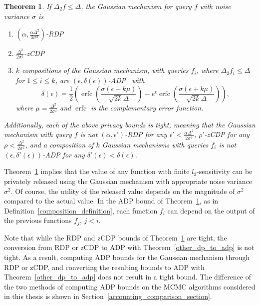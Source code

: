 \documentclass[english,twoside,openright]{HYgraduMLDS}
\newtheorem{theorem}{Theorem}
\DeclareMathOperator{\erfc}{erfc}
\begin{document}
\begin{theorem}\label{gauss-DP-bounds}
  If \(\Delta_{2}f \leq \Delta\), the Gaussian mechanism for query \(f\) with
  noise variance \(\sigma\) is
    \begin{enumerate}
        \item 
            \((\alpha, \frac{\alpha \Delta^2}{2\sigma^2})\)-RDP~\cite{Mironov17}
        \item 
            \(\frac{\Delta^2}{2\sigma^2}\)-zCDP~\cite{BuS16}
        \item 
            \(k\) compositions of the Gaussian mechanism, with
            queries \(f_{i}\), where \(\Delta_{2}f_{i}\leq \Delta\) for
            \(1\leq i \leq k\), are
            \((\epsilon, \delta(\epsilon))\)-ADP~\cite{Sommer2019} with 
            \[
                \delta(\epsilon) 
                = \frac{1}{2}\left(
                    \erfc\left(\frac{\sigma(\epsilon - k\mu)}{\sqrt{2k}\Delta}\right)
                    - e^\epsilon \erfc\left(\frac{\sigma(\epsilon + k\mu)}{\sqrt{2k}\Delta}\right)
                \right),
            \]
            where \(\mu = \frac{\Delta^2}{2\sigma^2}\) and \(\erfc\) is 
            the complementary error function.
    \end{enumerate}
    Additionally, each of the above privacy bounds is tight, meaning that
    the Gaussian mechanism with query \(f\) is not \((\alpha, \epsilon')\)-RDP
    for any \(\epsilon' < \frac{\alpha\Delta^{2}}{2\sigma^{2}}\), \(\rho'\)-zCDP
    for any \(\rho < \frac{\Delta^{2}}{2\sigma^{2}}\), and a composition
    of \(k\) Gaussian mechanisms with queries \(f_{i}\) is not
    \((\epsilon, \delta'(\epsilon))\)-ADP for any
    \(\delta'(\epsilon) < \delta(\epsilon)\).
\end{theorem}

Theorem~\ref{gauss-DP-bounds} implies that the value of any function with
finite \(l_2\)-sensitivity can be privately released using the Gaussian mechanism
with appropriate noise variance \(\sigma^2\). Of course, the utility of the
released value depends on the magnitude of \(\sigma^2\) compared to the actual
value. In the ADP bound of Theorem~\ref{gauss-DP-bounds},
as in Definition~\ref{composition_definition}, each function \(f_{i}\)
can depend on the output of the previous functions \(f_{j}\), \(j < i\).

Note that while the RDP and zCDP bounds of Theorem~\ref{gauss-DP-bounds} are
tight, the conversion from RDP or zCDP to ADP with Theorem~\ref{other_dp_to_adp}
is not tight. As a result, computing
ADP bounds for the Gaussian mechanism through RDP or zCDP, and converting
the resulting bounds to ADP with Theorem~\ref{other_dp_to_adp} does not
result in a tight bound. The difference of the two methods of computing ADP bounds
on the MCMC algorithms considered in this thesis is shown in
Section~\ref{accounting_comparison_section}.
\end{document}

